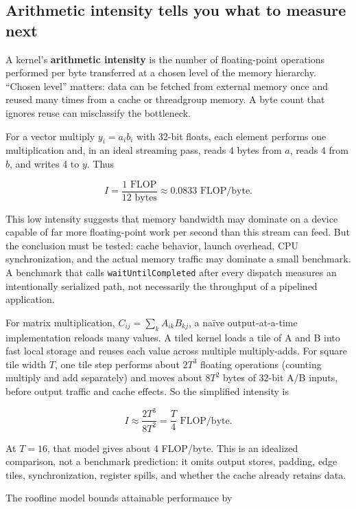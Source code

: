 \subsection{Arithmetic intensity tells you what to measure next}\label{05-engine-i-ch019-arithmetic-intensity-tells-you-what-to-measure-next}

A kernel's \textbf{arithmetic intensity} is the number of floating-point operations performed per byte transferred at a chosen level of the memory hierarchy. ``Chosen level'' matters: data can be fetched from external memory once and reused many times from a cache or threadgroup memory. A byte count that ignores reuse can misclassify the bottleneck.

For a vector multiply \(y_i=a_i b_i\) with 32-bit floats, each element performs one multiplication and, in an ideal streaming pass, reads 4 bytes from \(a\), reads 4 from \(b\), and writes 4 to \(y\). Thus

\[
I=\frac{1\text{ FLOP}}{12\text{ bytes}}\approx0.0833\text{ FLOP/byte}.
\]

This low intensity suggests that memory bandwidth may dominate on a device capable of far more floating-point work per second than this stream can feed. But the conclusion must be tested: cache behavior, launch overhead, CPU synchronization, and the actual memory traffic may dominate a small benchmark. A benchmark that calls \texttt{waitUntilCompleted} after every dispatch measures an intentionally serialized path, not necessarily the throughput of a pipelined application.

For matrix multiplication, \(C_{ij}=\sum_k A_{ik}B_{kj}\), a naïve output-at-a-time implementation reloads many values. A tiled kernel loads a tile of A and B into fast local storage and reuses each value across multiple multiply-adds. For square tile width \(T\), one tile step performs about \(2T^3\) floating operations (counting multiply and add separately) and moves about \(8T^2\) bytes of 32-bit A/B inputs, before output traffic and cache effects. So the simplified intensity is

\[
I\approx\frac{2T^3}{8T^2}=\frac{T}{4}\text{ FLOP/byte}.
\]

At \(T=16\), that model gives about 4 FLOP/byte. This is an idealized comparison, not a benchmark prediction: it omits output stores, padding, edge tiles, synchronization, register spills, and whether the cache already retains data.

The roofline model bounds attainable performance by

